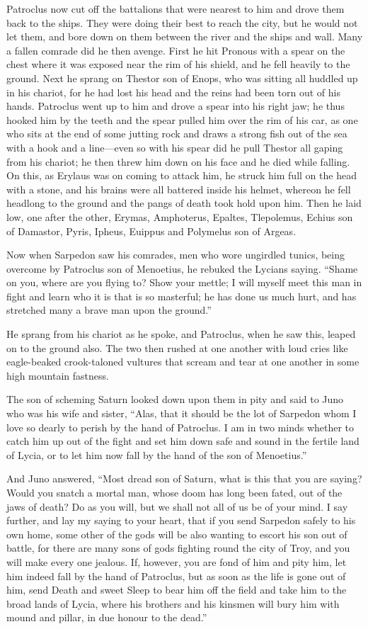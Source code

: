 Patroclus now cut off the battalions that were nearest to him and drove
them back to the ships. They were doing their best to reach the city, but
he would not let them, and bore down on them between the river and the
ships and wall. Many a fallen comrade did he then avenge. First he hit
Pronous with a spear on the chest where it was exposed near the rim of his
shield, and he fell heavily to the ground. Next he sprang on Thestor son
of Enops, who was sitting all huddled up in his chariot, for he had lost
his head and the reins had been torn out of his hands. Patroclus went up
to him and drove a spear into his right jaw; he thus hooked him by the
teeth and the spear pulled him over the rim of his car, as one who sits at
the end of some jutting rock and draws a strong fish out of the sea with a
hook and a line—even so with his spear did he pull Thestor all
gaping from his chariot; he then threw him down on his face and he died
while falling. On this, as Erylaus was on coming to attack him, he struck
him full on the head with a stone, and his brains were all battered inside
his helmet, whereon he fell headlong to the ground and the pangs of death
took hold upon him. Then he laid low, one after the other, Erymas,
Amphoterus, Epaltes, Tlepolemus, Echius son of Damastor, Pyris, Ipheus,
Euippus and Polymelus son of Argeas.

Now when Sarpedon saw his comrades, men who wore ungirdled tunics, being
overcome by Patroclus son of Menoetius, he rebuked the Lycians saying.
“Shame on you, where are you flying to? Show your mettle; I will myself
meet this man in fight and learn who it is that is so masterful; he has
done us much hurt, and has stretched many a brave man upon the ground.”

He sprang from his chariot as he spoke, and Patroclus, when he saw this,
leaped on to the ground also. The two then rushed at one another with loud
cries like eagle-beaked crook-taloned vultures that scream and tear at one
another in some high mountain fastness.

The son of scheming Saturn looked down upon them in pity and said to Juno
who was his wife and sister, “Alas, that it should be the lot of Sarpedon
whom I love so dearly to perish by the hand of Patroclus. I am in two
minds whether to catch him up out of the fight and set him down safe and
sound in the fertile land of Lycia, or to let him now fall by the hand of
the son of Menoetius.”

And Juno answered, “Most dread son of Saturn, what is this that you are
saying? Would you snatch a mortal man, whose doom has long been fated, out
of the jaws of death? Do as you will, but we shall not all of us be of
your mind. I say further, and lay my saying to your heart, that if you
send Sarpedon safely to his own home, some other of the gods will be also
wanting to escort his son out of battle, for there are many sons of gods
fighting round the city of Troy, and you will make every one jealous. If,
however, you are fond of him and pity him, let him indeed fall by the hand
of Patroclus, but as soon as the life is gone out of him, send Death and
sweet Sleep to bear him off the field and take him to the broad lands of
Lycia, where his brothers and his kinsmen will bury him with mound and
pillar, in due honour to the dead.”

